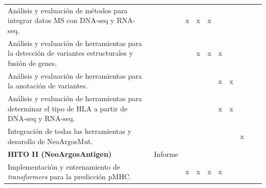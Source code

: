 \documentclass[a4paper,11pt]{article}
\begin{document}
\begin{table}[H]
{{\begin{tabular}{|p{10cm}|l|c|c|c|c|c|c|c|c|}
				Análisis y evaluación de métodos para integrar datos MS con DNA-seq y RNA-seq.       &       & x                     &                 x      &     x                   &                     &                       &                        &                                              &    \\
				
				
				
				
				
				Análisis y evaluación de herramientas para la detección de variantes estructurales y fusión de genes.      &                       &                      &    x                  & x                       &     x           &                      &                        &                                              &    \\
				
				Análisis y evaluación de herramientas para la anotación de variantes.      &                       &                      &                       &                        & x                      &      x                 &                        &                                              &    \\
				
				Análisis y evaluación de herramientas para determinar el tipo de HLA a partir de DNA-seq y RNA-seq.      &                       &                      &                      &                        &     x           &     x                 &                        &                                              &    \\
				
				Integración de todas las herramientas y desarollo de NeoArgosMut.      &                       &                     &                       &                        &                       &                       &    x                    &                                              &    \\
				
				\hline
				
				
				\textbf{HITO II (NeoArgosAntigen)} & Informe & & & & & & & & \\
				Implementación y entrenamiento de \textit{transformers} para la predicción pMHC. &  &        x             &      x                  &                 x        & x                      &                 &                      & &                                                 \\
				

\end{tabular}}}
\end{table}
\end{document}
